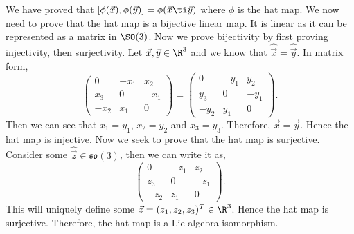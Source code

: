 \noindent
We have proved that $[\phi(\vec x), \phi(\vec y)] = \phi(\vec x \ti \vec y)$ where $\phi$ is the hat map. We now need to prove that the hat map is a bijective linear map. It is linear as it can be represented as a matrix in $\SO(3)$. Now we prove bijectivity by first proving injectivity, then surjectivity. Let $\vec x, \vec y \in \R^3$ and we know that $\hat{\vec x} = \hat{\vec y}$. In matrix form,
$$ \begin{pmatrix}
  0 & -x_1 & x_2 \\ x_3 & 0 & -x_1 \\ -x_2 & x_1 & 0
\end{pmatrix} = \begin{pmatrix}
  0 & -y_1 & y_2 \\ y_3 & 0 & -y_1 \\ -y_2 & y_1 & 0
\end{pmatrix}. $$
Then we can see that $x_1 = y_1$, $x_2 = y_2$ and $x_3 = y_3$. Therefore, $\vec x = \vec y$. Hence the hat map is injective. Now we seek to prove that the hat map is surjective. Consider some $\hat{\vec z} \in \mathfrak{so}(3)$, then we can write it as,
$$ \begin{pmatrix}
  0 & -z_1 & z_2 \\ z_3 & 0 & -z_1 \\ -z_2 & z_1 & 0
\end{pmatrix}. $$
This will uniquely define some $\vec z = (z_1, z_2, z_3)^T \in \R^3$. Hence the hat map is surjective. Therefore, the hat map is a Lie algebra isomorphism.\\

